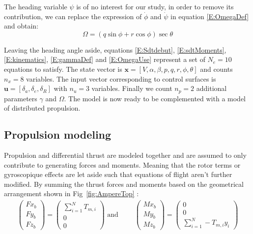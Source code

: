 The heading variable $\psi$ is of no interest for our study, in order to remove its contribution, we can replace the expression of $\dot{\phi}$ and $\dot{\psi}$ in equation \ref{E:OmegaDef} and obtain:
\begin{equation}
\Omega = \left( q \sin \phi + r \cos \phi \right) \sec \theta \label{E:OmegaUse}
\end{equation}

Leaving the heading angle aside, equations \ref{E:Sdtdebut}, \ref{E:sdtMoments}, \ref{E:kinematics}, \ref{E:gammaDef} and \ref{E:OmegaUse} represent a set of $N_e=10$ equations to satisfy. The state vector is $\textbf{x}=[V,\alpha,\beta,p,q,r,\phi,\theta]$ and counts $n_x=8$ variables. The input vector corresponding to control surfaces is $\textbf{u}=[\delta_a, \delta_e, \delta_R]$ with $n_u=3$ variables. Finally we count $n_p=2$ additional parameters $\gamma$ and $\Omega$. The model is now ready to be complemented with a model of distributed propulsion.

\subsection{Propulsion modeling}

Propulsion and differential thrust are modeled together and are assumed to only contribute to generating forces and moments. Meaning that the rotor terms or gyroscopique effects are let aside such that equations of flight aren't further modified.
By summing the thrust forces and moments based on the geometrical arrangement shown in Fig~\ref{fig:AmpereTop} :
\begin{align}
\begin{pmatrix}
Fx_b\\
Fy_b\\
Fz_b
\end{pmatrix}
=
\begin{pmatrix}
\sum_{i=1}^{N} T_{m,i}\\
0\\
0
\end{pmatrix}
\text{ and }
\qquad
\begin{pmatrix}
Mx_b\\
My_b\\
Mz_b
\end{pmatrix}
=\begin{pmatrix}
0\\
0\\
\sum_{i=1}^{N} -T_{m,i} y_i
\end{pmatrix}
\end{align}

